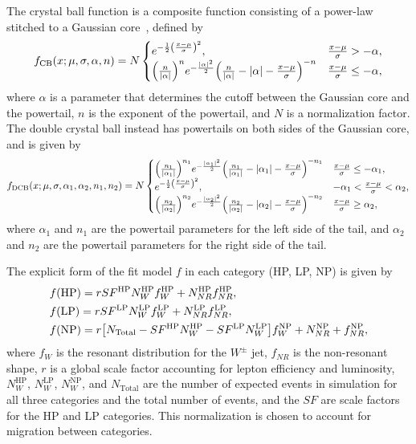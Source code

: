 The crystal ball function is a composite function consisting of a power-law stitched to a Gaussian core~\cite{Cheng_2016}, defined by
\begin{equation}
  f_\mathrm{CB}(x;\mu,\sigma,\alpha,n)=N
  \begin{cases}
    e^{-\frac{1}{2}\pqty{\frac{x-\mu}{\sigma}}^2}, & \frac{x-\mu}{\sigma}>-\alpha,\\
    \pqty{\frac{n}{|\alpha|}}^ne^{-\frac{|\alpha|^2}{2}}\pqty{\frac{n}{|\alpha|}-|\alpha|-\frac{x-\mu}{\sigma}}^{-n} & \frac{x-\mu}{\sigma}\leq-\alpha,
  \end{cases}
\end{equation}
where $\alpha$ is a parameter that determines the cutoff between the Gaussian core and the powertail, $n$ is the exponent of the powertail, and $N$ is a normalization factor.
The double crystal ball instead has powertails on both sides of the Gaussian core, and is given by
\begin{equation}
  f_\mathrm{DCB}(x;\mu,\sigma,\alpha_1,\alpha_2,n_1,n_2)=N
  \begin{cases}
    \pqty{\frac{n_1}{|\alpha_1|}}^{n_1}e^{-\frac{|\alpha_1|^2}{2}}\pqty{\frac{n_1}{|\alpha_1|}-|\alpha_1|-\frac{x-\mu}{\sigma}}^{-n_1} & \frac{x-\mu}{\sigma}\leq-\alpha_1,\\
    e^{-\frac{1}{2}\pqty{\frac{x-\mu}{\sigma}}^2}, & -\alpha_1<\frac{x-\mu}{\sigma}<\alpha_2,\\
    \pqty{\frac{n_2}{|\alpha_2|}}^{n_2}e^{-\frac{|\alpha_2|^2}{2}}\pqty{\frac{n_2}{|\alpha_2|}-|\alpha_2|-\frac{x-\mu}{\sigma}}^{-n_2} & \frac{x-\mu}{\sigma}\geq\alpha_2,
  \end{cases}
\end{equation}
where $\alpha_1$ and $n_1$ are the powertail parameters for the left side of the tail, and $\alpha_2$ and $n_2$ are the powertail parameters for the right side of the tail.

The explicit form of the fit model $f$ in each category (HP, LP, NP) is given by
\begin{align}
  & f(\mathrm{HP})=rSF^\mathrm{HP}N_W^\mathrm{HP}f_W^\mathrm{HP}+N_{NR}^\mathrm{HP}f_{NR}^\mathrm{HP},\label{eq:VtagFit1}\\
  & f(\mathrm{LP})=rSF^\mathrm{LP}N_W^\mathrm{LP}f_W^\mathrm{LP}+N_{NR}^\mathrm{LP}f_{NR}^\mathrm{LP},\label{eq:VtagFit2}\\
  & f(\mathrm{NP})=r\bqty{N_\mathrm{Total}-SF^\mathrm{HP}N_W^\mathrm{HP}-SF^\mathrm{LP}N_W^\mathrm{LP}}f_W^\mathrm{NP}+N_{NR}^\mathrm{NP}+f_{NR}^\mathrm{NP},\label{eq:VtagFit3}
\end{align}
where $f_W$ is the resonant distribution for the $W^\pm$ jet, $f_{NR}$ is the non-resonant shape, $r$ is a global scale factor accounting for lepton efficiency and luminosity, $N_{W}^\mathrm{HP}$, $N_{W}^\mathrm{LP}$, $N_{W}^\mathrm{NP}$, and $N_\mathrm{Total}$ are the number of expected events in simulation for all three categories and the total number of events, and the $SF$ are scale factors for the HP and LP categories.
This normalization is chosen to account for migration between categories.

